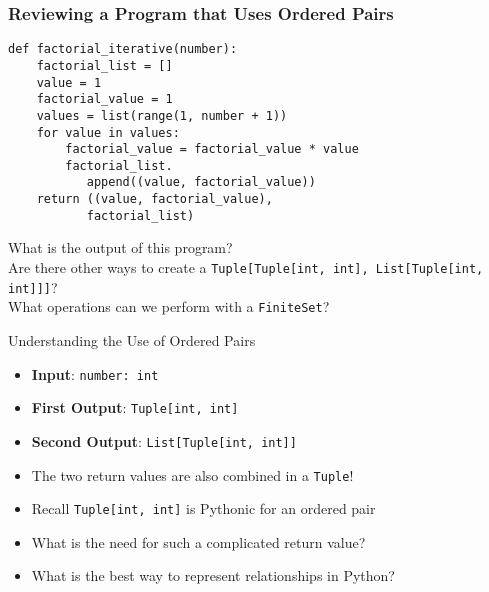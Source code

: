 \documentclass[14pt,aspectratio=169]{beamer}
\begin{document}
%
\begin{frame}[fragile]
  \frametitle{Reviewing a Program that Uses Ordered Pairs}
  \hspace*{-.25in}
  \begin{minipage}{6in}
    \vspace*{.2in}
    \begin{verbatim}
def factorial_iterative(number):
    factorial_list = []
    value = 1
    factorial_value = 1
    values = list(range(1, number + 1))
    for value in values:
        factorial_value = factorial_value * value
        factorial_list.
           append((value, factorial_value))
    return ((value, factorial_value),
           factorial_list)
    \end{verbatim}
  \end{minipage}
  \vspace*{.25in}
  \begin{center}
    \normalsize \noindent What is the output of this program? \\
    \normalsize \noindent Are there other ways to create a {\tt Tuple[Tuple[int, int], List[Tuple[int, int]]]}? \\
    \normalsize \noindent What operations can we perform with a {\tt FiniteSet}? \\
  \end{center}
\end{frame}

%
\begin{frame}{Understanding the Use of Ordered Pairs}
  \begin{itemize}
    \item {\bf Input}: {\tt number: int}
      \vspace*{-.15in}
    \item {\bf First Output}: {\tt Tuple[int, int]}
      \vspace*{-.15in}
    \item {\bf Second Output}: {\tt List[Tuple[int, int]]}
      \vspace*{-.15in}
    \item The two return values are also combined in a {\tt Tuple}!
      \vspace*{-.15in}
    \item Recall {\tt Tuple[int, int]} is Pythonic for an ordered pair
      \vspace*{-.15in}
    \item What is the need for such a complicated return value?
      \vspace*{-.15in}
    \item What is the best way to represent relationships in Python?
  \end{itemize}
\end{frame}
\end{document}
